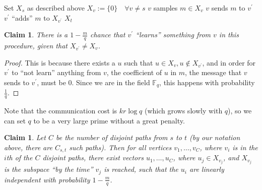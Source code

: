 \documentclass[11pt]{article}
\newcommand{\F}{\mathbb{F}}
\newtheorem{claim}[theorem]{Claim}
\begin{document}
\begin{algorithm}[H]
\begin{algorithmic}
  \State Set $X_s$ as described above
  \State $X_v := \{0\} \quad \forall v \not= s$
    \State $v$ samples $m \in X_v$
    \State $v$ sends $m$ to $v^\prime$
    \State $v^\prime$ ``adds'' $m$ to $X_{v^\prime}$
  \EndFor
  \State %
  \Return $X_t$
\EndFunction
\end{algorithmic}
\end{algorithm}

\begin{claim}
There is a $1 - \frac{m}{q}$ chance that $v^\prime$ ``learns'' something from $v$ in this procedure, given that $X_{v^\prime} \neq X_v$.
\end{claim}
\begin{proof}
This is because there exists a $u$ such that $u\in X_v, u \notin X_{v^\prime}$, and in order for $v^\prime$ to ``not learn'' anything from $v$, the coefficient of $u$ in $m$, the message that $v$ sends to $v^\prime$, must be 0. Since we are in the field $\F_q$, this happens with probability $\frac{1}{q}$.
\end{proof}

Note that the communication cost is $kr\log q$ (which grows slowly with $q$), so we can set $q$ to be a very large prime without a great penalty.

\begin{claim}
Let $C$ be the number of disjoint paths from $s$ to $t$ (by our notation above, there are $C_{s,t}$ such paths). Then for all vertices $v_1, \ldots, v_C$, where $v_i$ is in the $i$th of the $C$ disjoint paths, there exist vectors $u_1, \ldots, u_C$, where $u_j \in X_{v_j}$, and $X_{v_j}$ is the subspace ``by the time'' $v_j$ is reached, such that the $u_i$ are linearly independent with probability $1 - \frac{m}{q}$.
\end{claim}
\end{document}
